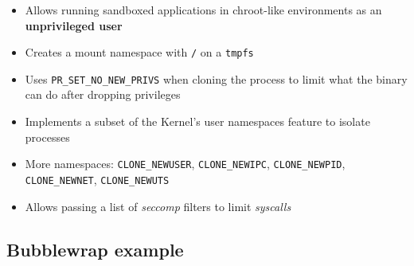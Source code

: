 \begin{frame}[fragile]
  \frametitle{\insertsubsection}

    \begin{itemize}
    \item Allows running sandboxed applications in chroot-like environments as an \textbf{unprivileged user}\vspacing
    \item Creates a mount namespace with \texttt{/} on a \texttt{tmpfs}\vspacing
    \item Uses \texttt{PR\_SET\_NO\_NEW\_PRIVS} when cloning the process to limit what the binary can do after dropping privileges\vspacing
    \item Implements a subset of the Kernel's user namespaces feature to isolate processes\vspacing
    \item More namespaces: \small{\texttt{CLONE\_NEWUSER}, \texttt{CLONE\_NEWIPC}, \texttt{CLONE\_NEWPID}, \texttt{CLONE\_NEWNET}, \texttt{CLONE\_NEWUTS}}\vspacing
    \item Allows passing a list of \textit{seccomp} filters to limit \textit{syscalls}\vspacing
    \end{itemize}

\end{frame}

\subsection{Bubblewrap example}

